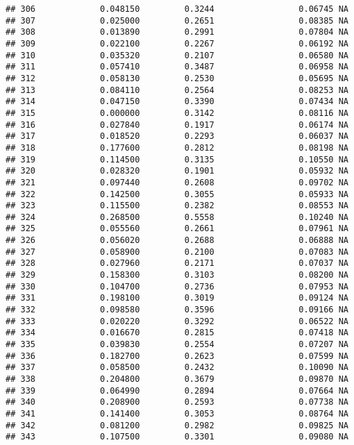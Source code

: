 \documentclass[
]{article}
\begin{document}
\begin{verbatim}
## 306             0.048150         0.3244                 0.06745 NA
## 307             0.025000         0.2651                 0.08385 NA
## 308             0.013890         0.2991                 0.07804 NA
## 309             0.022100         0.2267                 0.06192 NA
## 310             0.035320         0.2107                 0.06580 NA
## 311             0.057410         0.3487                 0.06958 NA
## 312             0.058130         0.2530                 0.05695 NA
## 313             0.084110         0.2564                 0.08253 NA
## 314             0.047150         0.3390                 0.07434 NA
## 315             0.000000         0.3142                 0.08116 NA
## 316             0.027840         0.1917                 0.06174 NA
## 317             0.018520         0.2293                 0.06037 NA
## 318             0.177600         0.2812                 0.08198 NA
## 319             0.114500         0.3135                 0.10550 NA
## 320             0.028320         0.1901                 0.05932 NA
## 321             0.097440         0.2608                 0.09702 NA
## 322             0.142500         0.3055                 0.05933 NA
## 323             0.115500         0.2382                 0.08553 NA
## 324             0.268500         0.5558                 0.10240 NA
## 325             0.055560         0.2661                 0.07961 NA
## 326             0.056020         0.2688                 0.06888 NA
## 327             0.058900         0.2100                 0.07083 NA
## 328             0.027960         0.2171                 0.07037 NA
## 329             0.158300         0.3103                 0.08200 NA
## 330             0.104700         0.2736                 0.07953 NA
## 331             0.198100         0.3019                 0.09124 NA
## 332             0.098580         0.3596                 0.09166 NA
## 333             0.020220         0.3292                 0.06522 NA
## 334             0.016670         0.2815                 0.07418 NA
## 335             0.039830         0.2554                 0.07207 NA
## 336             0.182700         0.2623                 0.07599 NA
## 337             0.058500         0.2432                 0.10090 NA
## 338             0.204800         0.3679                 0.09870 NA
## 339             0.064990         0.2894                 0.07664 NA
## 340             0.208900         0.2593                 0.07738 NA
## 341             0.141400         0.3053                 0.08764 NA
## 342             0.081200         0.2982                 0.09825 NA
## 343             0.107500         0.3301                 0.09080 NA

\end{verbatim}
\end{document}
